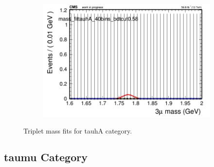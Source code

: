 \begin{figure}[H]
\begin{subfigure}{0.2\textwidth}
        \caption{}
    \end{subfigure}
    \begin{subfigure}{0.2\textwidth}
        \includegraphics[width=\textwidth]{flat_fit/plots/tauhA/massfit_tauhA_40bins_bdtcut0.58.png}
        \caption{}
    \end{subfigure}
    \caption{Triplet mass fits for tauhA category.}
    \label{fig:flatfittauhA}
\end{figure}

\subsection{taumu Category}
\label{sec:flatfittaumu}

